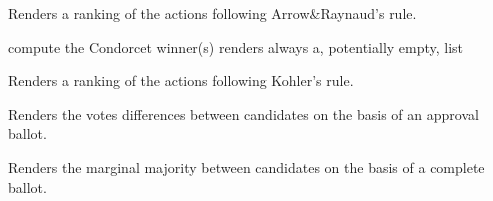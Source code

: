 \documentclass[letterpaper,10pt,english]{sphinxmanual}
\begin{document}
\begin{fulllineitems}
\begin{fulllineitems}
\label{techDoc:votingDigraphs.CondorcetDigraph.computeArrowRaynaudRanking}
Renders a ranking of the actions following Arrow\&Raynaud's rule.

\end{fulllineitems}


\begin{fulllineitems}
\label{techDoc:votingDigraphs.CondorcetDigraph.computeCondorcetWinner}
compute the Condorcet winner(s)
renders always a, potentially empty, list

\end{fulllineitems}


\begin{fulllineitems}
\label{techDoc:votingDigraphs.CondorcetDigraph.computeKohlerRanking}
Renders a ranking of the actions following Kohler's rule.

\end{fulllineitems}


\begin{fulllineitems}
\label{techDoc:votingDigraphs.CondorcetDigraph.constructApprovalBallotRelation}
Renders the votes differences between candidates
on the basis of an approval ballot.

\end{fulllineitems}


\begin{fulllineitems}
\label{techDoc:votingDigraphs.CondorcetDigraph.constructBallotRelation}
Renders the marginal majority between candidates
on the basis of a complete ballot.


\end{fulllineitems}
\end{fulllineitems}
\end{document}

